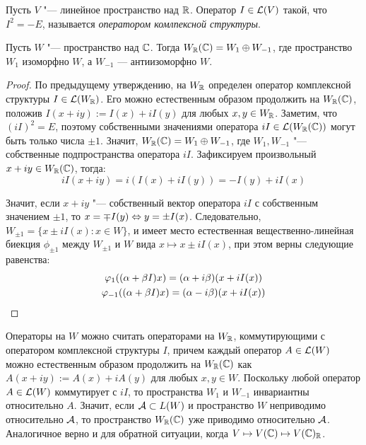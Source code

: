 \begin{definition}
	Пусть $V$ "--- линейное пространство над $\R$. Оператор $I \in \mc L(V)$ такой, что $I^2 = -E$, называется \textit{оператором комлпексной структуры}.
\end{definition}

\begin{proposition}
	Пусть $W$ "--- пространство над $\Cm$. Тогда $W_\R(\Cm) = W_1 \oplus W_{-1}$, где пространство $W_1$ изоморфно $W$, а $W_{-1}$ --- антиизоморфно $W$.
\end{proposition}

\begin{proof}
	По предыдущему утверждению, на $W_\R$ определен оператор комплексной структуры $I \in \mc L(W_\R)$. Его можно естественным образом продолжить на $W_\R(\Cm)$, положив $I(x + iy) := I(x) + iI(y)$ для любых $x, y \in W_\R$. Заметим, что $(iI)^2 = E$, поэтому собственными значениями оператора $iI \in \mc L(W_\R(\Cm))$ могут быть только числа $\pm1$. Значит, $W_\R(\Cm) = W_1 \oplus W_{-1}$, где $W_1, W_{-1}$ "--- собственные подпространства оператора $iI$. Зафиксируем произвольный $x + iy \in W_\R(\Cm)$, тогда:
	\[iI(x + iy) = i(I(x) + iI(y)) = -I(y) + iI(x)\]
	
	Значит, если $x + iy$ "--- собственный вектор оператора $iI$ с собственным значением $\pm1$, то $x = \mp I(y) \lra y = \pm I(x)$. Следовательно, $W_{\pm1} = \{x \pm iI(x) : x \in W\}$, и имеет место естественная вещественно-линейная биекция $\phi_{\pm1}$ между $W_{\pm1}$ и $W$ вида $x \mapsto x \pm iI(x)$, при этом верны следующие равенства:
	\begin{gather*}
		\phi_1((\alpha + \beta I)x) = (\alpha + i\beta)(x + iI(x))\\
		\phi_{-1}((\alpha + \beta I)x) = (\alpha - i\beta)(x + iI(x))\qedhere
	\end{gather*}
\end{proof}

\begin{note}
	Операторы на $W$ можно считать операторами на $W_\R$, коммутирующими с оператором комплексной структуры $I$, причем каждый оператор $A \in \mc L(W)$ можно естественным образом продолжить на $W_\R(\Cm)$ как $A(x + iy) := A(x) + iA(y)$ для любых $x, y \in W$. Поскольку любой оператор $A \in \mc L(W)$ коммутирует с $iI$, то пространства $W_1$ и $W_{-1}$ инвариантны относительно $A$. Значит, если $\mc A \subset L(W)$ и пространство $W$ неприводимо относительно $\mc A$, то пространство $W_\R(\Cm)$ уже приводимо относительно $\mc A$. Аналогичное верно и для обратной ситуации, когда $V \mapsto V(\Cm) \mapsto V(\Cm)_\R$.
\end{note}

